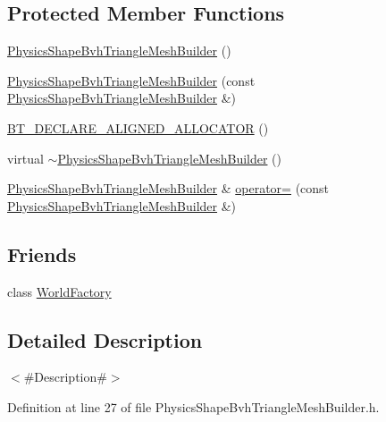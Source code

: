 \subsection*{Protected Member Functions}
\begin{DoxyCompactItemize}
\item 
\mbox{\hyperlink{classnjli_1_1_physics_shape_bvh_triangle_mesh_builder_a31a08f20298fb972cafa73efe7ca9eec}{Physics\+Shape\+Bvh\+Triangle\+Mesh\+Builder}} ()
\item 
\mbox{\hyperlink{classnjli_1_1_physics_shape_bvh_triangle_mesh_builder_ac86f9bfd4a49a18b3f41c4199e9058ab}{Physics\+Shape\+Bvh\+Triangle\+Mesh\+Builder}} (const \mbox{\hyperlink{classnjli_1_1_physics_shape_bvh_triangle_mesh_builder}{Physics\+Shape\+Bvh\+Triangle\+Mesh\+Builder}} \&)
\item 
\mbox{\hyperlink{classnjli_1_1_physics_shape_bvh_triangle_mesh_builder_a01af1bc430fbb5b7b13e0e54e7d099e1}{B\+T\+\_\+\+D\+E\+C\+L\+A\+R\+E\+\_\+\+A\+L\+I\+G\+N\+E\+D\+\_\+\+A\+L\+L\+O\+C\+A\+T\+OR}} ()
\item 
virtual \mbox{\hyperlink{classnjli_1_1_physics_shape_bvh_triangle_mesh_builder_a5239a5706920c27d516419ccd5db22b3}{$\sim$\+Physics\+Shape\+Bvh\+Triangle\+Mesh\+Builder}} ()
\item 
\mbox{\hyperlink{classnjli_1_1_physics_shape_bvh_triangle_mesh_builder}{Physics\+Shape\+Bvh\+Triangle\+Mesh\+Builder}} \& \mbox{\hyperlink{classnjli_1_1_physics_shape_bvh_triangle_mesh_builder_a56d926d92fcf0c61be03b6ee09a0c079}{operator=}} (const \mbox{\hyperlink{classnjli_1_1_physics_shape_bvh_triangle_mesh_builder}{Physics\+Shape\+Bvh\+Triangle\+Mesh\+Builder}} \&)
\end{DoxyCompactItemize}
\subsection*{Friends}
\begin{DoxyCompactItemize}
\item 
class \mbox{\hyperlink{classnjli_1_1_physics_shape_bvh_triangle_mesh_builder_acb96ebb09abe8f2a37a915a842babfac}{World\+Factory}}
\end{DoxyCompactItemize}


\subsection{Detailed Description}
$<$\#\+Description\#$>$ 

Definition at line 27 of file Physics\+Shape\+Bvh\+Triangle\+Mesh\+Builder.\+h.



